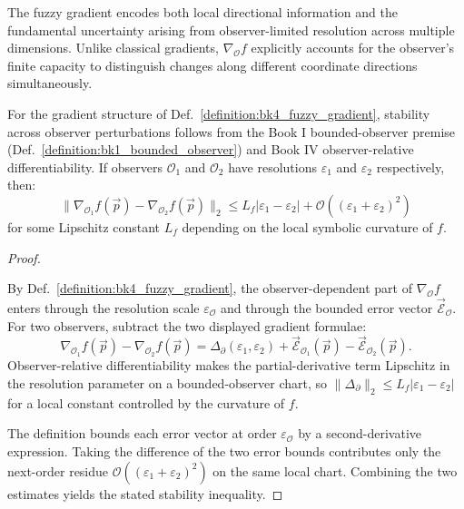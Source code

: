 The fuzzy gradient encodes both local directional information and the fundamental uncertainty arising from observer-limited resolution across multiple dimensions. Unlike classical gradients, $\nabla_{\mathcal{O}} f$ explicitly accounts for the observer's finite capacity to distinguish changes along different coordinate directions simultaneously.

\begin{lemma}
\label{lemma:bk4_gradient_stability}
For the gradient structure of Def.~\ref{definition:bk4_fuzzy_gradient}, stability across observer perturbations follows from the Book I bounded-observer premise (Def.~\ref{definition:bk1_bounded_observer}) and Book IV observer-relative differentiability.
If observers $\mathcal{O}_1$ and $\mathcal{O}_2$ have resolutions $\varepsilon_1$ and $\varepsilon_2$ respectively, then:
\[
\|\nabla_{\mathcal{O}_1} f(\vec{p}) - \nabla_{\mathcal{O}_2} f(\vec{p})\|_2 \leq L_f |\varepsilon_1 - \varepsilon_2| + \mathcal{O}((\varepsilon_1 + \varepsilon_2)^2)
\]
for some Lipschitz constant $L_f$ depending on the local symbolic curvature of $f$.
\end{lemma}

\begin{proof}
\label{proof:bk4_gradient_stability}
\leavevmode

By Def.~\ref{definition:bk4_fuzzy_gradient}, the observer-dependent part of
$\nabla_{\mathcal O}f$ enters through the resolution scale
$\varepsilon_{\mathcal O}$ and through the bounded error vector
$\vec{\mathcal E}_{\mathcal O}$. For two observers, subtract the two displayed
gradient formulae:
\[
\nabla_{\mathcal O_1}f(\vec p)-\nabla_{\mathcal O_2}f(\vec p)
 =
\Delta_{\partial}(\varepsilon_1,\varepsilon_2)
 +
\vec{\mathcal E}_{\mathcal O_1}(\vec p)
 -
\vec{\mathcal E}_{\mathcal O_2}(\vec p).
\]
Observer-relative differentiability makes the partial-derivative term Lipschitz
in the resolution parameter on a bounded-observer chart, so
$\|\Delta_{\partial}\|_2\leq L_f|\varepsilon_1-\varepsilon_2|$ for a local
constant controlled by the curvature of $f$.

The definition bounds each error vector at order $\varepsilon_{\mathcal O}$ by a
second-derivative expression. Taking the difference of the two error bounds
contributes only the next-order residue
$\mathcal O((\varepsilon_1+\varepsilon_2)^2)$ on the same local chart. Combining
the two estimates yields the stated stability inequality.
\end{proof}

